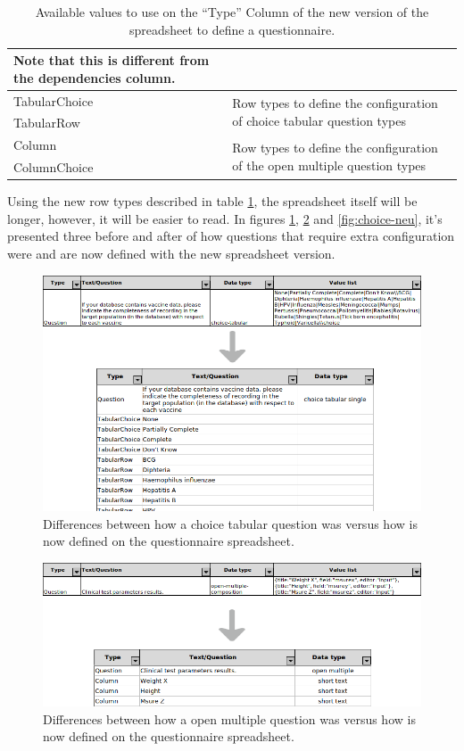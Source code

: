 \begin{table}[H]
\begin{tabular}{| p{.2\linewidth} | p{.8\linewidth} |}
        Note that this is different from the dependencies column. \\ \hline
TabularChoice                 & \multirow{2}{*}{Row types to define the configuration of choice tabular question types}    \\ \cline{1-1}
TabularRow                    &                                                                                            \\ \hline
Column                        & \multirow{2}{*}{Row types to define the configuration of the open multiple question types} \\ \cline{1-1}
ColumnChoice                  &                                                                                            \\ \hline
\end{tabular}
\caption{Available values to use on the ``Type'' Column of the new version of the spreadsheet to define a questionnaire.}
\label{tab:excel-row-types}
\end{table}

Using the new row types described in table \ref{tab:excel-row-types}, the spreadsheet itself will be longer, however, it will be easier to read.
In figures \ref{fig:choice-tabular-neu}, \ref{fig:open-multiple-neu} and \ref{fig:choice-neu}, it's presented three before and after of how questions that require extra configuration were and are now defined with the new spreadsheet version.

\begin{figure}
    \center
    \includegraphics[width=.75\textwidth]{choice-tabular-neu}
    \caption{Differences between how a choice tabular question was versus how is now defined on the questionnaire spreadsheet.}
    \label{fig:choice-tabular-neu}
\end{figure}

\begin{figure}
    \center
    \includegraphics[width=.75\textwidth]{open-multiple-neu}
    \caption{Differences between how a open multiple question was versus how is now defined on the questionnaire spreadsheet.}
    \label{fig:open-multiple-neu}
\end{figure}


